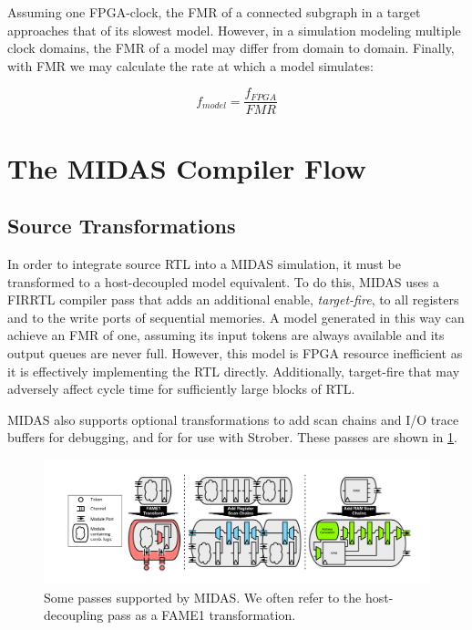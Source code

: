 \noindent Assuming one FPGA-clock, the FMR of a connected subgraph in a target
approaches that of its slowest model. However, in a simulation modeling
multiple clock domains, the FMR of a model may differ from domain to domain.
Finally, with FMR we may calculate the rate at which a model simulates:

$$ f_{model} = \frac{f_{FPGA}}{FMR} $$

\section{The MIDAS Compiler Flow}

\subsection{Source Transformations}\label{sec:source-transformations}

In order to integrate source RTL into a MIDAS simulation, it must be
transformed to a host-decoupled model equivalent.  To do this, MIDAS uses a
FIRRTL compiler pass that adds an additional enable, \emph{target-fire}, to all
registers and to the write ports of sequential memories. A model generated in
this way can achieve an FMR of one, assuming its input tokens are always
available and its output queues are never full.  However, this model is FPGA
resource inefficient as it is effectively implementing the RTL directly.
Additionally, target-fire that may adversely affect cycle time for sufficiently
large blocks of RTL.

MIDAS also supports optional transformations to add scan chains and I/O trace
buffers for debugging, and for for use with Strober\cite{strober}. These passes
are shown in \ref{fig:midas-passes}.

\begin{figure}
	\centering
	\includegraphics[width=16cm]{figures/midas-passes.pdf}
    \caption{Some passes supported by MIDAS. We often refer to the
    host-decoupling pass as a FAME1 transformation\cite{fame}.}
	\label{fig:midas-passes}
	\centering
\end{figure}


